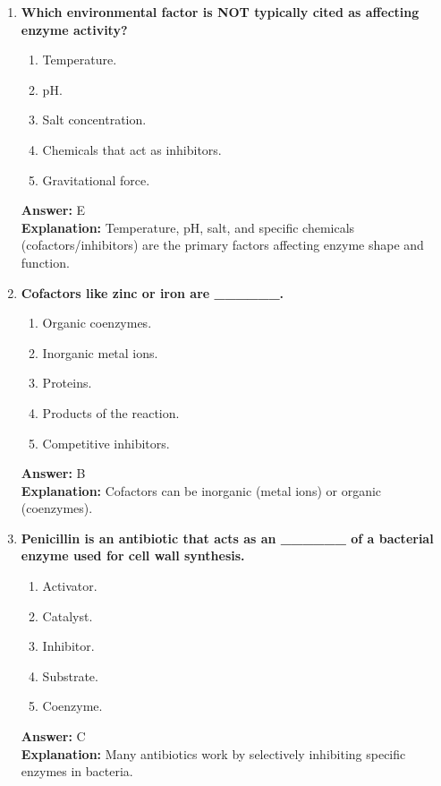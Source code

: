 \documentclass[11pt, a4paper]{article}
\begin{document}
\begin{enumerate}[leftmargin=*, label=\arabic*.]
\item \textbf{Which environmental factor is NOT typically cited as affecting enzyme activity?}
\begin{enumerate}[label=\Alph*.]
    \item Temperature.
    \item pH.
    \item Salt concentration.
    \item Chemicals that act as inhibitors.
    \item Gravitational force.
\end{enumerate}
\textbf{Answer:} E \\
\textbf{Explanation:} Temperature, pH, salt, and specific chemicals (cofactors/inhibitors) are the primary factors affecting enzyme shape and function.

\item \textbf{Cofactors like zinc or iron are \_\_\_\_\_\_.}
\begin{enumerate}[label=\Alph*.]
    \item Organic coenzymes.
    \item Inorganic metal ions.
    \item Proteins.
    \item Products of the reaction.
    \item Competitive inhibitors.
\end{enumerate}
\textbf{Answer:} B \\
\textbf{Explanation:} Cofactors can be inorganic (metal ions) or organic (coenzymes).

\item \textbf{Penicillin is an antibiotic that acts as an \_\_\_\_\_\_ of a bacterial enzyme used for cell wall synthesis.}
\begin{enumerate}[label=\Alph*.]
    \item Activator.
    \item Catalyst.
    \item Inhibitor.
    \item Substrate.
    \item Coenzyme.
\end{enumerate}
\textbf{Answer:} C \\
\textbf{Explanation:} Many antibiotics work by selectively inhibiting specific enzymes in bacteria.


\end{enumerate}
\end{document}
